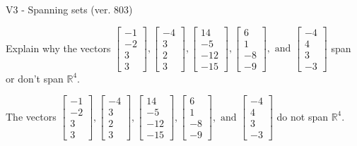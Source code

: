 \begin{exercise}
  \begin{exerciseTitle}V3 - Spanning sets (ver. 803)\end{exerciseTitle}
  \begin{exerciseStatement}
    Explain why the vectors \(\left[\begin{array}{r}
-1 \\
-2 \\
3 \\
3
\end{array}\right] , \left[\begin{array}{r}
-4 \\
3 \\
2 \\
3
\end{array}\right] , \left[\begin{array}{r}
14 \\
-5 \\
-12 \\
-15
\end{array}\right] , \left[\begin{array}{r}
6 \\
1 \\
-8 \\
-9
\end{array}\right] , \text{ and } \left[\begin{array}{r}
-4 \\
4 \\
3 \\
-3
\end{array}\right]\) span or don't span \(\mathbb{R}^4\). 
	


  \end{exerciseStatement}
  \begin{exerciseAnswer}
   The vectors \(\left[\begin{array}{r}
-1 \\
-2 \\
3 \\
3
\end{array}\right] , \left[\begin{array}{r}
-4 \\
3 \\
2 \\
3
\end{array}\right] , \left[\begin{array}{r}
14 \\
-5 \\
-12 \\
-15
\end{array}\right] , \left[\begin{array}{r}
6 \\
1 \\
-8 \\
-9
\end{array}\right] , \text{ and } \left[\begin{array}{r}
-4 \\
4 \\
3 \\
-3
\end{array}\right]\) 
  	 do not  
	span \(\mathbb{R}^4\).
  



\end{exerciseAnswer}
\end{exercise}
